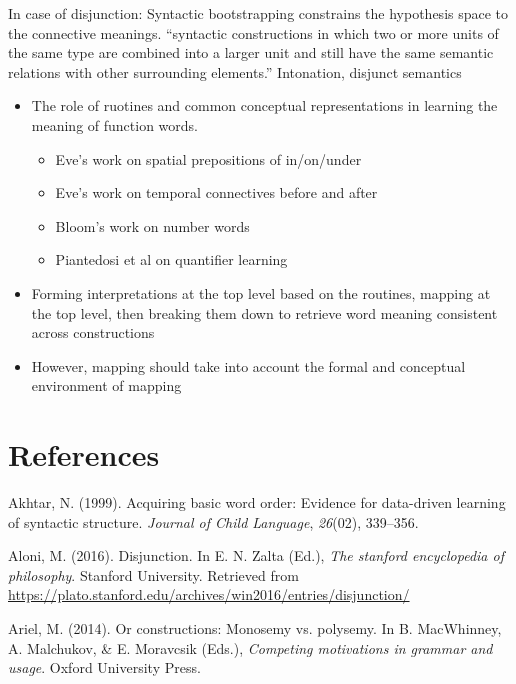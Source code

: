 \documentclass[oneside]{report}
\theoremstyle{definition}
\theoremstyle{definition}
\theoremstyle{definition}
\theoremstyle{remark}
\begin{document}
In case of disjunction: Syntactic bootstrapping constrains the
hypothesis space to the connective meanings. ``syntactic constructions
in which two or more units of the same type are combined into a larger
unit and still have the same semantic relations with other surrounding
elements.'' Intonation, disjunct semantics
\begin{itemize}
\tightlist
\item
  The role of ruotines and common conceptual representations in learning
  the meaning of function words.
  \begin{itemize}
  \tightlist
  \item
    Eve's work on spatial prepositions of in/on/under
  \item
    Eve's work on temporal connectives before and after
  \item
    Bloom's work on number words
  \item
    Piantedosi et al on quantifier learning
  \end{itemize}
\item
  Forming interpretations at the top level based on the routines,
  mapping at the top level, then breaking them down to retrieve word
  meaning consistent across constructions
\item
  However, mapping should take into account the formal and conceptual
  environment of mapping
\end{itemize}
\chapter*{References}\label{references}


\noindent

\setlength{\parindent}{-0.20in} \setlength{\leftskip}{0.20in}
\setlength{\parskip}{8pt}

\hypertarget{refs}{}
\hypertarget{ref-akhtar1999acquiring}{}
Akhtar, N. (1999). Acquiring basic word order: Evidence for data-driven
learning of syntactic structure. \emph{Journal of Child Language},
\emph{26}(02), 339--356.

\hypertarget{ref-Aloni2016}{}
Aloni, M. (2016). Disjunction. In E. N. Zalta (Ed.), \emph{The stanford
encyclopedia of philosophy}. Stanford University. Retrieved from
\url{https://plato.stanford.edu/archives/win2016/entries/disjunction/}

\hypertarget{ref-Ariel2014}{}
Ariel, M. (2014). Or constructions: Monosemy vs. polysemy. In B.
MacWhinney, A. Malchukov, \& E. Moravcsik (Eds.), \emph{Competing
motivations in grammar and usage}. Oxford University Press.
\end{document}

